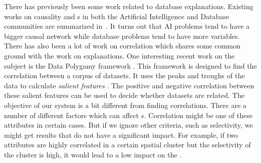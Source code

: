 There has previously been some work related to database explanations. 
Existing works on causality and {\explanation}s in both the Artificial Intelligence and Database communities are summarized in~\cite{meliou2014causality}. It turns out that AI problems tend to have a bigger causal network while database problems tend to have more variables.
There has also been a lot of work on correlation which shares some common ground with the work on explanations. One interesting recent work on the subject is the Data Polygamy framework \cite{chirigati2016data}. This framework is designed to find the correlation between a corpus of datasets. It uses the peaks and troughs of the data to calculate \textit{salient features} \cite{dunn1986applied}. The positive and negative correlation between these salient features can be used to decide whether datasets are related\cite{su2014supporting}. The objective of our system is a bit different from finding correlations. There are a number of different factors which can affect {\fact}s. Correlation might be one of these attributes in certain cases. But if we ignore other criteria, such as selectivity, we might get results that do not have a significant impact. For example, if two attributes are highly correlated in a certain spatial cluster but the selectivity of the cluster is high, it would lead to a low impact on the {\fact}.





